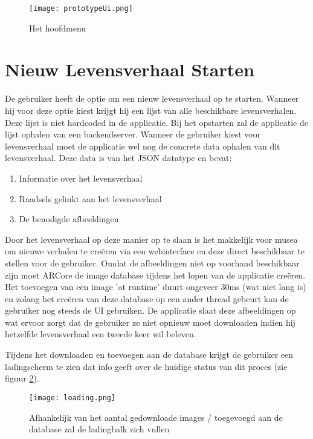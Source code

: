\begin{figure}
    \texttt{[image: prototypeUi.png]}
    \caption{Het hoofdmenu}
    \label{fig:prototypeUi}
\end{figure}

\section{Nieuw Levensverhaal Starten}
De gebruiker heeft de optie om een nieuw levensverhaal op te starten. Wanneer hij voor deze optie kiest krijgt hij een lijst van alle beschikbare levensverhalen. Deze lijst is niet hardcoded in de applicatie. Bij het opstarten zal de applicatie de lijst ophalen van een backendserver. Wanneer de gebruiker kiest voor levensverhaal moet de applicatie wel nog de concrete data ophalen van dit levensverhaal. Deze data is van het JSON datatype en bevat:

\begin{enumerate}
    \item Informatie over het levensverhaal
    \item Raadsels gelinkt aan het levensverhaal
    \item De benodigde afbeeldingen
\end{enumerate}

Door het levensverhaal op deze manier op te slaan is het makkelijk voor musea om nieuwe verhalen te creëren via een webinterface en deze direct beschikbaar te stellen voor de gebruiker. Omdat de afbeeldingen niet op voorhand beschikbaar zijn moet ARCore de image database tijdens het lopen van de applicatie creëren. Het toevoegen van een image 'at runtime' duurt ongeveer 30ms (wat niet lang is) en zolang het creëren van deze database op een ander thread gebeurt kan de gebruiker nog steeds de UI gebruiken. De applicatie slaat deze afbeeldingen op wat ervoor zorgt dat de gebruiker ze niet opnieuw moet downloaden indien hij hetzelfde levensverhaal een tweede keer wil beleven. 

Tijdens het downloaden en toevoegen aan de database krijgt de gebruiker een ladingscherm te zien dat info geeft over de huidige status van dit proces (zie figuur \ref{fig:loading}).
\begin{figure}
    \texttt{[image: loading.png]}
    \caption{Afhankelijk van het aantal gedownloade images / toegevoegd aan de database zal de ladingbalk zich vullen}
    \label{fig:loading}
\end{figure}

